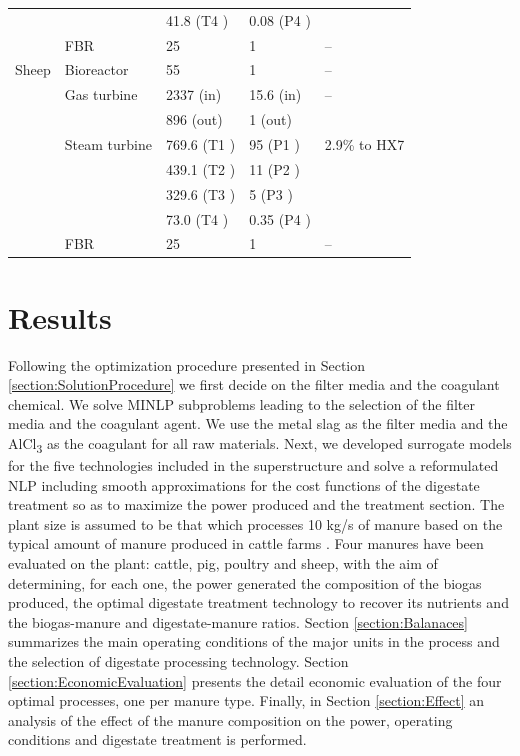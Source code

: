\begin{refsection}[referencesCh2]
\begin{table}[h!]
{\begin{tabular}{@{}lllll@{}}
		&               & 41.8 (T4 )  & 0.08 (P4 ) &              \\
		& FBR           & 25          & 1          & –            \\
		Sheep   & Bioreactor    & 55          & 1          & –            \\
		& Gas turbine   & 2337 (in)   & 15.6 (in)  & –            \\
		&               & 896 (out)   & 1 (out)    &              \\
		& Steam turbine & 769.6 (T1 ) & 95 (P1 )   & 2.9\% to HX7 \\
		&               & 439.1 (T2 ) & 11 (P2 )   &              \\
		&               & 329.6 (T3 ) & 5 (P3 )    &              \\
		&               & 73.0 (T4 )  & 0.35 (P4 ) &              \\
		& FBR           & 25          & 1          & –            \\ \bottomrule
	\end{tabular}
	}
\end{table}

\section{Results} \label{section:Results}
Following the optimization procedure presented in Section \ref{section:SolutionProcedure} we first decide on the filter media and the coagulant chemical. We solve MINLP subproblems leading to the selection of the filter media and the coagulant agent. We use the metal slag as the filter media and the AlCl\textsubscript{3} as the coagulant for all raw materials. Next, we developed surrogate models for the five technologies included in the superstructure and solve a reformulated NLP including smooth approximations for the cost functions of the digestate treatment so as to maximize the power produced and the treatment section. The plant size is assumed to be that which processes 10 kg/s of manure based on the typical amount of manure produced in cattle farms \citep{LeonMsc}. Four manures have been evaluated on the plant: cattle, pig, poultry and sheep, with the aim of determining, for each one, the power generated the composition of the biogas produced, the optimal digestate treatment technology to recover its nutrients and the biogas-manure and digestate-manure ratios. Section \ref{section:Balanaces} summarizes the main operating conditions of the major units in the process and the selection of digestate processing technology. Section \ref{section:EconomicEvaluation} presents the detail economic evaluation of the four optimal processes, one per manure type. Finally, in Section \ref{section:Effect} an analysis of the effect of the manure composition on the power, operating conditions and digestate treatment is performed.



\end{refsection}
